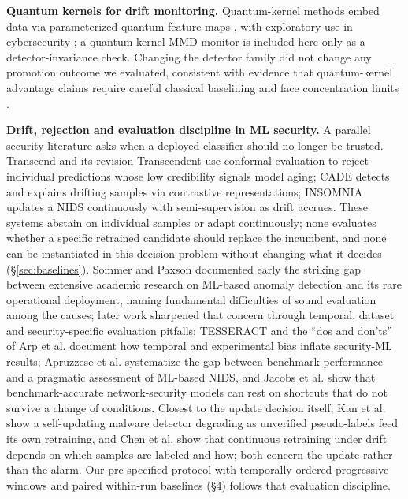 \documentclass[a4paper,fleqn]{cas-sc}
\begin{document}
\textbf{Quantum kernels for drift monitoring.} Quantum-kernel methods embed data via parameterized quantum feature maps \cite{havlicek2019supervised,schuld2019quantum,huang2021power}, with exploratory use in cybersecurity \cite{gouveia2020towards,nicesio2023quantum,bellante2025evaluating}; a quantum-kernel MMD monitor is included here only as a detector-invariance check. Changing the detector family did not change any promotion outcome we evaluated, consistent with evidence that quantum-kernel advantage claims require careful classical baselining and face concentration limits \cite{schnabel2025quantum,thanasilp2024concentration}.


\textbf{Drift, rejection and evaluation discipline in ML security.} A parallel security literature asks when a deployed classifier should no longer be trusted. Transcend \cite{jordaney2017transcend} and its revision Transcendent \cite{barbero2022transcendent} use conformal evaluation to reject individual predictions whose low credibility signals model aging; CADE \cite{yang2021cade} detects and explains drifting samples via contrastive representations; INSOMNIA \cite{andresini2021insomnia} updates a NIDS continuously with semi-supervision as drift accrues. These systems abstain on individual samples or adapt continuously; none evaluates whether a specific retrained candidate should replace the incumbent, and none can be instantiated in this decision problem without changing what it decides (\S\ref{sec:baselines}). Sommer and Paxson \cite{sommer2010outside} documented early the striking gap between extensive academic research on ML-based anomaly detection and its rare operational deployment, naming fundamental difficulties of sound evaluation among the causes; later work sharpened that concern through temporal, dataset and security-specific evaluation pitfalls: TESSERACT \cite{pendlebury2019tesseract} and the ``dos and don'ts'' of Arp et al. \cite{arp2022dodonts} document how temporal and experimental bias inflate security-ML results; Apruzzese et al. \cite{apruzzese2023sok} systematize the gap between benchmark performance and a pragmatic assessment of ML-based NIDS, and Jacobs et al. \cite{jacobs2022emperor} show that benchmark-accurate network-security models can rest on shortcuts that do not survive a change of conditions. Closest to the update decision itself, Kan et al. \cite{kan2021labelless} show a self-updating malware detector degrading as unverified pseudo-labels feed its own retraining, and Chen et al. \cite{chen2023continuous} show that continuous retraining under drift depends on which samples are labeled and how; both concern the update rather than the alarm. Our pre-specified protocol with temporally ordered progressive windows and paired within-run baselines (\S4) follows that evaluation discipline.
\end{document}

